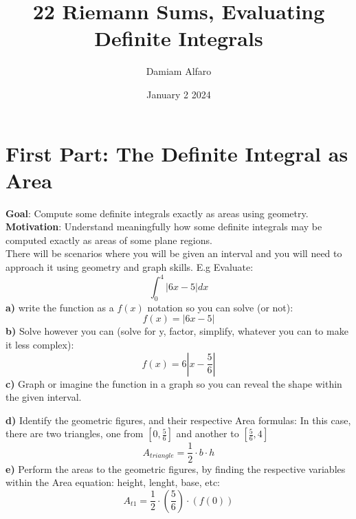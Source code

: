\documentclass[12pt, letterpaper]{article}
\title{22 Riemann Sums, Evaluating Definite Integrals}
\author{Damiam Alfaro}
\date{January 2 2024}
\begin{document}
\maketitle

\section{First Part: The Definite Integral as Area}
\textbf{Goal}: Compute some definite integrals exactly as areas using geometry.\\
\newline
\textbf{Motivation}: Understand meaningfully how some definite integrals may be computed exactly as areas of some plane regions.\\
\newline
There will be scenarios where you will be given an interval and you will need to approach it using geometry and graph skills. E.g Evaluate:
\[\int_{0}^{4} |6x-5|dx\]
\textbf{a)} write the function as a \(f(x)\) notation so you can solve (or not):
\[f(x)=|6x-5|\]
\textbf{b)} Solve however you can (solve for y, factor, simplify, whatever you can to make it less complex):
\[f(x)=6|x-\frac{5}{6}|\]
\textbf{c)} Graph or imagine the function in a graph so you can reveal the shape within the given interval.
\begin{center}

\end{center}
\textbf{d)} Identify the geometric figures, and their respective Area formulas: In this case, there are two triangles, one from \([0,\frac{5}{6}]\) and another to \([\frac{5}{6},4]\)
\[A_{triangle} = \frac{1}{2}\cdot b \cdot h\]
\textbf{e)} Perform the areas to the geometric figures, by finding the respective variables within the Area equation: height, lenght, base, etc:
\[A_{t1} = \frac{1}{2}\cdot \left( \frac{5}{6} \right) \cdot (f(0))\]
\end{document}
